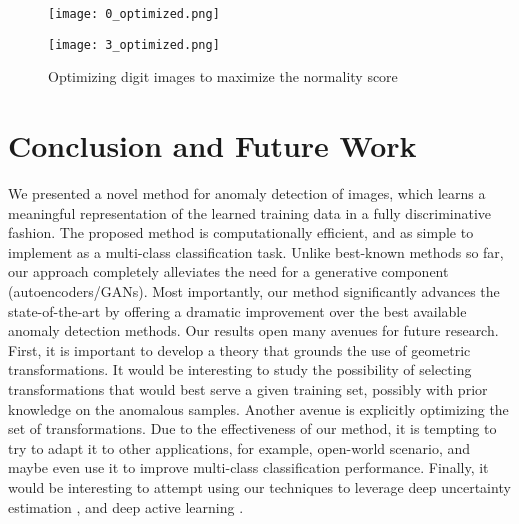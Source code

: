 \documentclass{article}
\begin{document}
    \begin{figure}
    \parbox{\dimexpr.25\linewidth-.5em}{\texttt{[image: 0\_optimized.png]}}
    \parbox[c][3.2cm][s]{\dimexpr.2\linewidth}{\label{fig:input_opt_a}}\hfill \parbox{\dimexpr.25\linewidth-.5em}{\texttt{[image: 3\_optimized.png]}}
    \parbox[c][3.1cm][s]{\dimexpr.2\linewidth}{\label{fig:input_opt_b}}
\caption{Optimizing digit images to maximize the normality score}
    \label{fig:fig:input_opt}
    \end{figure}
    
	\section{Conclusion and Future Work}
	We presented a novel method for anomaly detection of images, which learns a meaningful representation of the learned training data in a fully discriminative fashion. The proposed method is computationally efficient, and as simple to implement as a multi-class classification task. Unlike best-known methods so far, our approach completely alleviates the need for a generative component (autoencoders/GANs). Most importantly, our method significantly advances the state-of-the-art by offering a dramatic improvement over the best available anomaly detection methods. Our results open many avenues for future research. First, it is important to develop a theory that grounds the use of geometric transformations. It would be interesting to study the possibility of selecting transformations that would best serve a given training set, possibly with prior knowledge on the anomalous samples. Another avenue is explicitly optimizing the set of transformations. Due to the effectiveness of our method, it is tempting to try to adapt it to other applications, for example, open-world scenario, and maybe even use it to improve multi-class classification performance. 
	Finally, it would be interesting to attempt using 
	our techniques to leverage deep uncertainty estimation \cite{GeifmanUE18,NIPS2017_7073}, and deep active learning \cite{GeifmanE17}.


	
	
\end{document}
